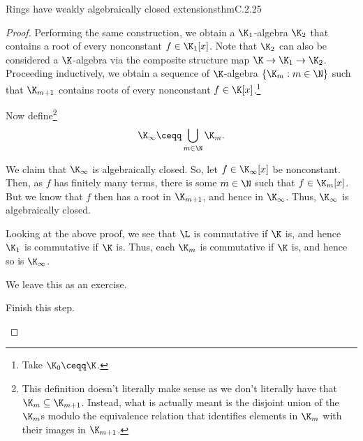 \begin{thm}{Rings have weakly algebraically closed extensions}{thmC.2.25}
\begin{proof}
		Performing the same construction, we obtain a $\K _1$-algebra $\K _2$ that contains a root of every nonconstant $f\in \K _1[x]$.  Note that $\K _2$ can also be considered a $\K$-algebra via the composite structure map $\K \rightarrow \K _1\rightarrow \K _2$.  Proceeding inductively, we obtain a sequence of $\K$-algebra $\{ \K _m:m\in \N \}$ such that $\K _{m+1}$ contains roots of every nonconstant $f\in \K [x]$.\footnote{Take $\K _0\ceqq \K$.}
		
		Now define\footnote{This definition doesn't literally make sense as we don't literally have that $\K _m\subseteq \K _{m+1}$.  Instead, what is actually meant is the disjoint union of the $\K _m$s modulo the equivalence relation that identifies elements in $\K _m$ with their images in $\K _{m+1}$.}
		\begin{equation}
			\K _{\infty}\ceqq \bigcup _{m\in \N}\K _m.
		\end{equation}
		
		We claim that $\K _{\infty}$ is algebraically closed.  So, let $f\in \K _{\infty}[x]$ be nonconstant.  Then, as $f$ has finitely many terms, there is some $m\in \N$ such that $f\in \K _m[x]$.  But we know that $f$ then has a root in $\K _{m+1}$, and hence in $\K _{\infty}$.  Thus, $\K _{\infty}$ is algebraically closed.
		
		Looking at the above proof, we see that $\L$ is commutative if $\K$ is, and hence $\K _1$ is commutative if $\K$ is.  Thus, each $\K _m$ is commutative if $\K$ is, and hence so is $\K _{\infty}$.
		
		We leave this as an exercise.
		\begin{exr}[breakable=false]{}{}
			Finish this step.
		\end{exr}
		

\end{proof}
\end{thm}
